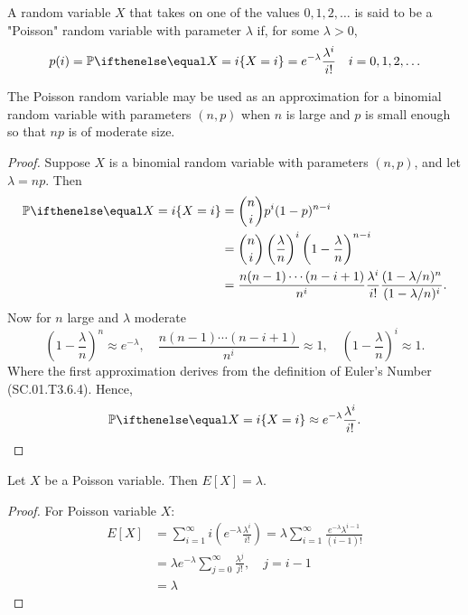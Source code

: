 \documentclass[a4paper,11pt]{article}
\begin{document}
\begin{outline}
    A random variable \(X\) that takes on one of the values \(0, 1, 2, \ldots\) is said to be a 
    "Poisson" random variable with parameter \(\lambda\) if, for some \(\lambda > 0\), \[ p(i) = \bbp[X=i] 
    = e^{-\lambda}\frac{\lambda^i}{i!}\quad i=0,1,2,\ldots \]
    
      The Poisson random variable may be used as an approximation for a binomial random variable with 
      parameters \((n,p)\) when \(n\) is large and \(p\) is small enough so that \(np\) is of moderate size.
      
      \begin{proof}
        Suppose \(X\) is a binomial random variable with parameters \((n,p)\), and let \(\lambda = np\). Then 
        \begin{align*}
          \bbp[X=i] &= \binom{n}{i}p^i(1-p)^{n-i} \\
                    &= \binom{n}{i}\left(\frac{\lambda}{n}\right)^i\left(1-\frac{\lambda}{n}\right)^{n-i} \\
                    &= \frac{n(n-1)\cdots(n-i+1)}{n^i}\frac{\lambda^i}{i!}\frac{(1-\lambda/n)^n}{(1-\lambda/n)^i}\text{.}
        \end{align*}
        Now for \(n\) large and \(\lambda\) moderate
        \[
          \left(1-\frac{\lambda}{n}\right)^n \approx e^{-\lambda},\quad
          \frac{n(n-1)\cdots(n-i+1)}{n^i}\approx 1,\quad
          \left(1-\frac{\lambda}{n}\right)^i \approx 1\text{.}
        \]
        Where the first approximation derives from the definition of Euler's Number (SC.01.T3.6.4). Hence, 
        \[\bbp[X=i] \approx e^{-\lambda}\frac{\lambda^i}{i!}\text{.} \]
      \end{proof}
      
      Let \(X\) be a Poisson variable. Then \(E[X] = \lambda\).
      
      \pagebreak
      \begin{proof}
        For Poisson variable \(X\):
        \begin{align*}
          E[X] &= \sum_{i=1}^{\infty}i\left(e^{-\lambda}\frac{\lambda^i}{i!}\right) 
               = \lambda\sum_{i=1}^{\infty}\frac{e^{-\lambda}\lambda^{i-1}}{(i-1)!} \\
               &= \lambda e^{-\lambda}\sum_{j=0}^{\infty}\frac{\lambda^j}{j!},\quad j=i-1 \\
               &= \lambda
        \end{align*}
      \end{proof}
    

\end{outline}
\end{document}

